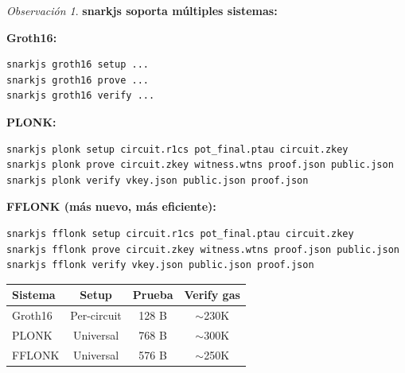 \documentclass[11pt,a4paper,twoside,openright]{book}
\theoremstyle{definition}
\theoremstyle{plain}
\theoremstyle{remark}
\newtheorem{remark}{Observación}[chapter]
\begin{document}
\begin{remark}
\textbf{snarkjs soporta múltiples sistemas:}

\textbf{Groth16:}
\begin{verbatim}
snarkjs groth16 setup ...
snarkjs groth16 prove ...
snarkjs groth16 verify ...
\end{verbatim}

\textbf{PLONK:}
\begin{verbatim}
snarkjs plonk setup circuit.r1cs pot_final.ptau circuit.zkey
snarkjs plonk prove circuit.zkey witness.wtns proof.json public.json
snarkjs plonk verify vkey.json public.json proof.json
\end{verbatim}

\textbf{FFLONK (más nuevo, más eficiente):}
\begin{verbatim}
snarkjs fflonk setup circuit.r1cs pot_final.ptau circuit.zkey
snarkjs fflonk prove circuit.zkey witness.wtns proof.json public.json
snarkjs fflonk verify vkey.json public.json proof.json
\end{verbatim}

\begin{center}
\begin{tabular}{lccc}
\toprule
\textbf{Sistema} & \textbf{Setup} & \textbf{Prueba} & \textbf{Verify gas} \\
\midrule
Groth16 & Per-circuit & 128 B & $\sim$230K \\
PLONK & Universal & 768 B & $\sim$300K \\
FFLONK & Universal & 576 B & $\sim$250K \\
\bottomrule
\end{tabular}
\end{center}
\end{remark}
\end{document}
